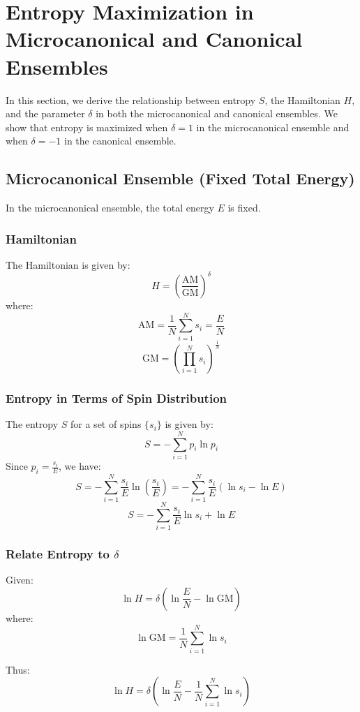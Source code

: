 \documentclass{article}
\begin{document}
\section{Entropy Maximization in Microcanonical and Canonical Ensembles}

In this section, we derive the relationship between entropy \(S\), the Hamiltonian \(H\), and the parameter \(\delta\) in both the microcanonical and canonical ensembles. We show that entropy is maximized when \(\delta = 1\) in the microcanonical ensemble and when \(\delta = -1\) in the canonical ensemble.

\subsection{Microcanonical Ensemble (Fixed Total Energy)}

In the microcanonical ensemble, the total energy \(E\) is fixed.

\subsubsection{Hamiltonian}

The Hamiltonian is given by:
\[
H = \left( \frac{\text{AM}}{\text{GM}} \right)^\delta
\]
where:
\[
\text{AM} = \frac{1}{N} \sum_{i=1}^N s_i = \frac{E}{N}
\]
\[
\text{GM} = \left( \prod_{i=1}^N s_i \right)^{\frac{1}{N}}
\]

\subsubsection{Entropy in Terms of Spin Distribution}

The entropy \(S\) for a set of spins \(\{s_i\}\) is given by:
\[
S = -\sum_{i=1}^N p_i \ln p_i
\]
Since \( p_i = \frac{s_i}{E} \), we have:
\[
S = -\sum_{i=1}^N \frac{s_i}{E} \ln \left( \frac{s_i}{E} \right) = -\sum_{i=1}^N \frac{s_i}{E} (\ln s_i - \ln E)
\]
\[
S = -\sum_{i=1}^N \frac{s_i}{E} \ln s_i + \ln E
\]

\subsubsection{Relate Entropy to \(\delta\)}

Given:
\[
\ln H = \delta \left( \ln \frac{E}{N} - \ln \text{GM} \right)
\]
where:
\[
\ln \text{GM} = \frac{1}{N} \sum_{i=1}^N \ln s_i
\]

Thus:
\[
\ln H = \delta \left( \ln \frac{E}{N} - \frac{1}{N} \sum_{i=1}^N \ln s_i \right)
\]
\end{document}
